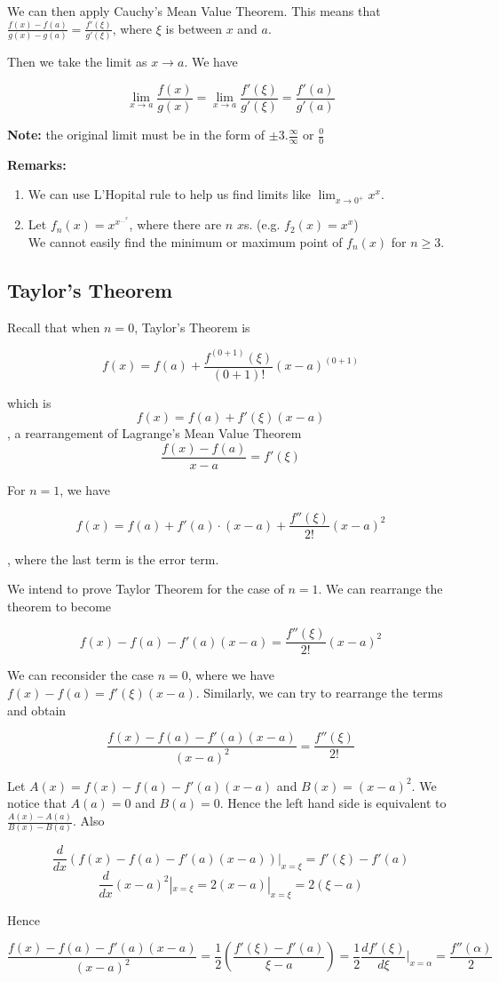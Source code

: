 We can then apply Cauchy's Mean Value Theorem. This means that $\frac{f(x) - f(a)}{g(x) - g(a)} = \frac{f'(\xi)}{g'(\xi)}$, where $\xi$ is between $x$ and $a$.

Then we take the limit as $x \to a$. We have

$$ \lim_{x \to a} \frac{f(x)}{g(x)} = \lim_{x \to a} \frac{f'(\xi)}{g'(\xi)} = \frac{f'(a)}{g'(a)} $$

\textbf{Note:} the original limit must be in the form of $\pm3.\frac{\infty}{\infty}$ or $\frac{0}{0}$

\textbf{Remarks:}

\begin{enumerate}
  \item We can use L'Hopital rule to help us find limits like $\lim_{x \to 0^{+}} x^x$.
  \item Let $f_n(x) = x^{x^{\dots^x}}$, where there are $n$ $x$s. (e.g. $f_2(x) = x^x$)\\
  We cannot easily find the minimum or maximum point of $f_n(x)$ for $n \geq 3$.
\end{enumerate}

\subsection{Taylor's Theorem}

Recall that when $n = 0$, Taylor's Theorem is

$$ f(x) = f(a) + \frac{f^{(0 + 1)}(\xi)}{(0 + 1)!} (x - a)^{(0 + 1)} $$

which is $$ f(x) = f(a) + f'(\xi)(x - a) $$, a rearrangement of Lagrange's Mean Value Theorem $$ \frac{f(x) - f(a)}{x - a} = f'(\xi) $$

For $n = 1$, we have

$$ f(x) = f(a) + f'(a) \cdot (x - a) + \frac{f''(\xi)}{2!} (x - a)^2 $$

, where the last term is the error term.

We intend to prove Taylor Theorem for the case of $n = 1$. We can rearrange the theorem to become

$$ f(x) - f(a) - f'(a)(x - a) = \frac{f''(\xi)}{2!} (x - a)^2 $$

We can reconsider the case $n = 0$, where we have $ f(x) - f(a) = f'(\xi)(x - a) $. Similarly, we can try to rearrange the terms and obtain

$$ \frac{f(x) - f(a) - f'(a)(x - a)}{(x - a)^2} = \frac{f''(\xi)}{2!} $$

Let $A(x) = f(x) - f(a) - f'(a)(x - a)$ and $B(x) = (x - a)^2$. We notice that $A(a) = 0$ and $B(a) = 0$. Hence the left hand side is equivalent to $ \frac{A(x) - A(a)}{B(x) - B(a)}$. Also

$$ \frac{d}{dx} (f(x) - f(a) - f'(a)(x - a))|_{x=\xi} = f'(\xi) - f'(a) $$
$$ \frac{d}{dx} (x - a)^2|_{x=\xi} = 2(x - a)|_{x = \xi} = 2(\xi - a) $$

Hence

$$ \frac{f(x) - f(a) - f'(a)(x - a)}{(x - a)^2} = \frac{1}{2} (\frac{f'(\xi) - f'(a)}{\xi - a}) = \frac{1}{2} \frac{df'(\xi)}{d\xi}|_{x = \alpha} = \frac{f''(\alpha)}{2} $$